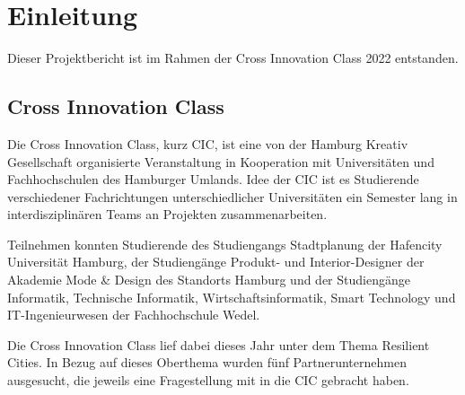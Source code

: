 \chapter{Einleitung}

    Dieser Projektbericht ist im Rahmen der Cross Innovation Class 2022 entstanden.

\section{Cross Innovation Class}

    Die Cross Innovation Class, kurz CIC, ist eine von der Hamburg Kreativ Gesellschaft organisierte Veranstaltung in Kooperation mit Universitäten und Fachhochschulen des Hamburger Umlands.
    Idee der CIC ist es Studierende verschiedener Fachrichtungen unterschiedlicher Universitäten ein Semester lang in interdisziplinären Teams an Projekten zusammenarbeiten.

    Teilnehmen konnten Studierende des Studiengangs Stadtplanung der Hafencity Universität Hamburg, der Studiengänge Produkt- und Interior-Designer der Akademie Mode \& Design des Standorts Hamburg und der Studiengänge Informatik, Technische Informatik, Wirtschaftsinformatik, Smart Technology und IT-Ingenieurwesen der Fachhochschule Wedel.

    Die Cross Innovation Class lief dabei dieses Jahr unter dem Thema Resilient Cities. In Bezug auf dieses Oberthema wurden fünf Partnerunternehmen ausgesucht, die jeweils eine Fragestellung mit in die CIC gebracht haben.


    \vspace{1em}
    \vspace{1em}
    
